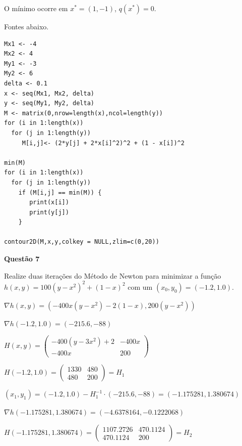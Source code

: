 \documentclass{rbfin}
\begin{document}
O mínimo ocorre em $x^* = (1,-1)$, $q(x^*) = 0$.

Fontes abaixo.

\singlespacing

\newpage

\begin{verbatim}
Mx1 <- -4
Mx2 <- 4
My1 <- -3
My2 <- 6
delta <- 0.1
x <- seq(Mx1, Mx2, delta)
y <- seq(My1, My2, delta)
M <- matrix(0,nrow=length(x),ncol=length(y))
for (i in 1:length(x))
  for (j in 1:length(y))
     M[i,j]<- (2*y[j] + 2*x[i]^2)^2 + (1 - x[i])^2

min(M)
for (i in 1:length(x))
  for (j in 1:length(y))
    if (M[i,j] == min(M)) {
       print(x[i])
       print(y[j])
    }

contour2D(M,x,y,colkey = NULL,zlim=c(0,20)) 
\end{verbatim}

\vspace{6mm}

\large

\textbf{Questão 7}

\normalsize

\vspace{6mm}

\doublespacing

Realize duas iterações do Método de Newton para minimizar a função $h(x, y) = 100(y - x^2)^2 +(1 - x)^2$ com um $(x_0, y_0) = (-1.2, 1.0)$.

$\nabla h(x,y) = (-400x(y - x^2) - 2(1 - x), 200(y - x^2))$

$\nabla h(-1.2, 1.0) = (-215.6,-88)$

$H(x,y) = \begin{pmatrix} -400(y - 3x^2) + 2 & -400x  \\ -400x & 200 \end{pmatrix}$

$H(-1.2, 1.0) = \begin{pmatrix} 1330 & 480 \\ 480 & 200 \end{pmatrix} = H_1$

$(x_1, y_1) = (-1.2, 1.0) - H_1^{-1} \cdot (-215.6,-88) = (-1.175281, 1.380674)$

$\nabla h(-1.175281, 1.380674) = (-4.6378164,-0.1222068)$

$H(-1.175281, 1.380674) = \begin{pmatrix} 1107.2726 & 470.1124 \\ 470.1124 & 200 \end{pmatrix} = H_2$
\end{document}
